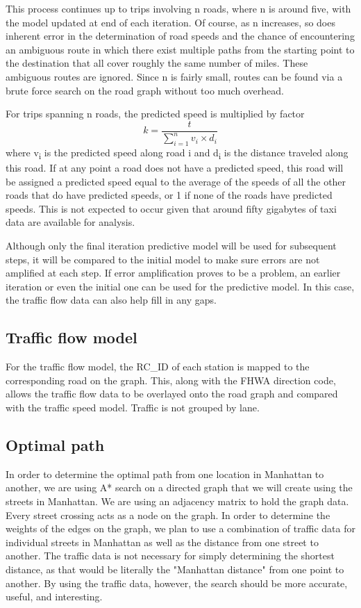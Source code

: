 \documentclass{sig-alternate}
\begin{document}
This process continues up to trips involving n roads, where n is around five, with the model updated at end of each iteration. Of course, as n increases, so does inherent error in the determination of road speeds and the chance of encountering an ambiguous route in which there exist multiple paths from the starting point to the destination that all cover roughly the same number of miles. These ambiguous routes are ignored. Since n is fairly small, routes can be found via a brute force search on the road graph without too much overhead.

For trips spanning n roads, the predicted speed is multiplied by factor
\begin{displaymath}
k=\frac{t}{\sum\limits_{i=1}^n v_{i}\times d_{i}}
\end{displaymath}
where v\textsubscript{i} is the predicted speed along road i and d\textsubscript{i} is the distance traveled along this road. If at any point a road does not have a predicted speed, this road will be assigned a predicted speed equal to the average of the speeds of all the other roads that do have predicted speeds, or 1 if none of the roads have predicted speeds. This is not expected to occur given that around fifty gigabytes of taxi data are available for analysis.

Although only the final iteration predictive model will be used for subsequent steps, it will be compared to the initial model to make sure errors are not amplified at each step. If error amplification proves to be a problem, an earlier iteration or even the initial one can be used for the predictive model. In this case, the traffic flow data can also help fill in any gaps.

\subsection{Traffic flow model}
For the traffic flow model, the RC\_ID of each station is mapped to the corresponding road on the graph. This, along with the FHWA direction code, allows the traffic flow data to be overlayed onto the road graph and compared with the traffic speed model. Traffic is not grouped by lane.

\subsection{Optimal path}
In order to determine the optimal path from one location in Manhattan to another, we are using A* search on a directed graph that we will create using the streets in Manhattan.  We are using an adjacency matrix to hold the graph data.  Every street crossing acts as a node on the graph.  In order to determine the weights of the edges on the graph, we plan to use a combination of traffic data for individual streets in Manhattan as well as the distance from one street to another. The traffic data is not necessary for simply determining the shortest distance, as that would be literally the "Manhattan distance" from one point to another.  By using the traffic data, however, the search should be more accurate, useful, and interesting.
\end{document}
